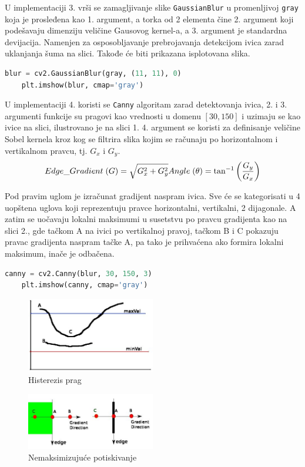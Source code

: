 \documentclass[fontsize=12bp, paper=a4]{scrarticle}
\begin{document}
U implementaciji 3. vrši se zamagljivanje slike \verb|GaussianBlur| u promenljivoj \verb|gray| koja je prosleđena kao 1. argument, a torka od 2 elementa čine 2. argument koji podešavaju dimenziju veličine Gausovog kernel-a, a 3. argument je standardna devijacija. Namenjen za osposobljavanje prebrojavanja detekcijom ivica zarad uklanjanja šuma na slici. Takođe će biti prikazana isplotovana slika.

\begin{lstlisting}[language=Python, caption=Učitavanje slike]
    blur = cv2.GaussianBlur(gray, (11, 11), 0) 
    plt.imshow(blur, cmap='gray') 
\end{lstlisting}

U implementaciji 4. koristi se \verb|Canny| algoritam zarad detektovanja ivica, 2. i 3. argumenti funkcije su pragovi kao vrednosti u domenu $[30, 150]$ i uzimaju se kao ivice na slici, ilustrovano je na slici 1. 4. argument\cite{canny} se koristi za definisanje veličine Sobel kernela kroz kog se filtrira slika kojim se računaju po horizontalnom i vertikalnom pravcu, tj. $G_x$ i $G_y$.
$$
Edge\_Gradient \; (G) = \sqrt{G_x^2 + G_y^2} \\
Angle \; (\theta) = \tan^{-1} \bigg(\frac{G_y}{G_x}\bigg)
$$

Pod pravim uglom je izračunat gradijent naspram ivica. Sve će se kategorisati u 4 uopštena uglova koji reprezentuju pravce horizontalni, vertikalni, 2 dijagonale. A zatim se uočavaju lokalni maksimumi u susetstvu po pravcu gradijenta kao na slici 2., gde tačkom A na ivici po vertikalnoj pravoj, tačkom B i C pokazuju pravac gradijenta naspram tačke A, pa tako je prihvaćena ako formira lokalni maksimum, inače je odbačena.

\begin{lstlisting}[language=Python, caption=Isticanje i plotovanje detektovanih ivica]
    canny = cv2.Canny(blur, 30, 150, 3) 
    plt.imshow(canny, cmap='gray') 
\end{lstlisting}

\begin{figure}[h!]
    \centering
    \includegraphics[width=0.5\textwidth]{2.png}
    \caption{\centering Histerezis prag}
\end{figure} 
\begin{figure}[h!]
    \centering
    \includegraphics[width=0.5\textwidth]{1.png}
    \caption{\centering Nemaksimizujuće potiskivanje}
\end{figure} 
\end{document}
